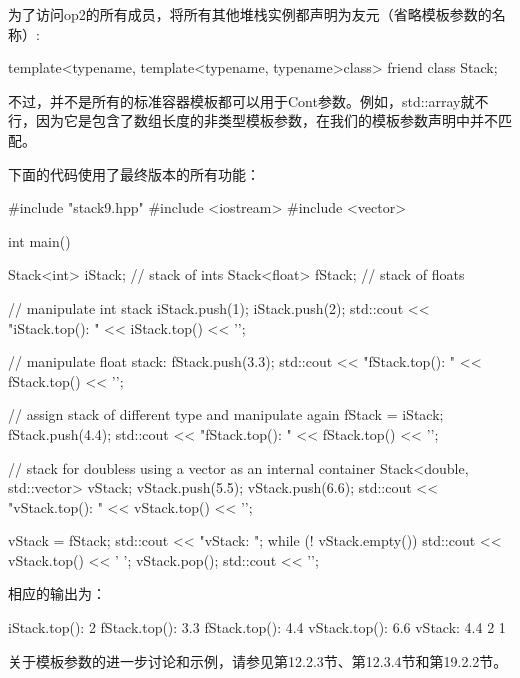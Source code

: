 为了访问op2的所有成员，将所有其他堆栈实例都声明为友元（省略模板参数的名称）:

\begin{cpp}
template<typename, template<typename, typename>class>
friend class Stack;
\end{cpp}

不过，并不是所有的标准容器模板都可以用于Cont参数。例如，std::array就不行，因为它是包含了数组长度的非类型模板参数，在我们的模板参数声明中并不匹配。

下面的代码使用了最终版本的所有功能：

\begin{cpp}
#include "stack9.hpp"
#include <iostream>
#include <vector>

int main() {
	Stack<int> iStack; // stack of ints
	Stack<float> fStack; // stack of floats
	
	// manipulate int stack
	iStack.push(1);
	iStack.push(2);
	std::cout << "iStack.top(): " << iStack.top() << '\n';
	
	// manipulate float stack:
	fStack.push(3.3);
	std::cout << "fStack.top(): " << fStack.top() << '\n';
	
	// assign stack of different type and manipulate again
	fStack = iStack;
	fStack.push(4.4);
	std::cout << "fStack.top(): " << fStack.top() << '\n';
	
	// stack for doubless using a vector as an internal container
	Stack<double, std::vector> vStack;
	vStack.push(5.5);
	vStack.push(6.6);
	std::cout << "vStack.top(): " << vStack.top() << '\n';
	
	vStack = fStack;
	std::cout << "vStack: ";
	while (! vStack.empty()) {
		std::cout << vStack.top() << ' ';
		vStack.pop();
	}
	std::cout << '\n';
}
\end{cpp}

相应的输出为：

\begin{shell}
iStack.top(): 2
fStack.top(): 3.3
fStack.top(): 4.4
vStack.top(): 6.6
vStack: 4.4 2 1
\end{shell}

关于模板参数的进一步讨论和示例，请参见第12.2.3节、第12.3.4节和第19.2.2节。





















